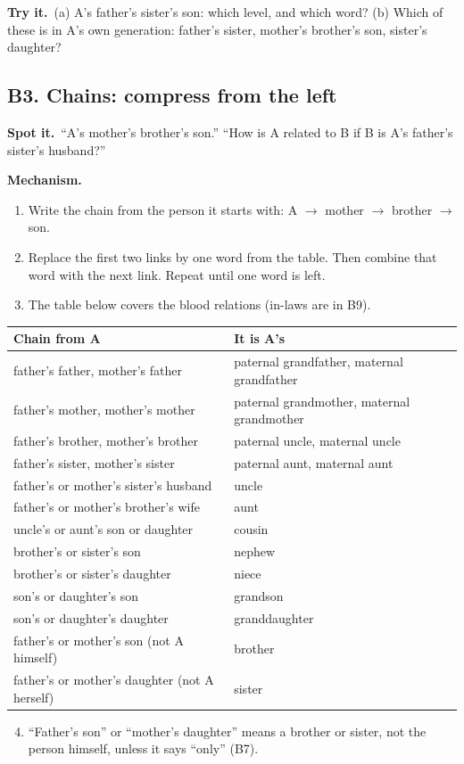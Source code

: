 \documentclass[11pt,a4paper]{article}
\let\oldsubsection\subsection
\renewcommand{\subsection}{\needspace{9\baselineskip}\oldsubsection}
\newcommand{\spot}{\textbf{\color{ember}Spot it.}\ }
\newcommand{\mech}{\textbf{\color{ember}Mechanism.}\ }
\newcommand{\tryit}[1]{\textbf{\color{ember}Try it.}\ #1}
\begin{document}
\tryit (a) A's father's sister's son: which level, and which word? (b) Which of these is in A's own generation: father's sister, mother's brother's son, sister's daughter?

\subsection{B3. Chains: compress from the left}
\spot ``A's mother's brother's son.'' ``How is A related to B if B is A's father's sister's husband?''

\mech
\begin{enumerate}
\item Write the chain from the person it starts with: A $\to$ mother $\to$ brother $\to$ son.
\item Replace the first two links by one word from the table. Then combine that word with the next link. Repeat until one word is left.
\item The table below covers the blood relations (in-laws are in B9).
\end{enumerate}
\begin{center}\small\renewcommand{\arraystretch}{1.18}\setlength{\tabcolsep}{8pt}
\begin{tabularx}{\linewidth}{@{}>{\raggedright\arraybackslash}X >{\raggedright\arraybackslash}X@{}}
\toprule
\textbf{\color{slate}Chain from A} & \textbf{\color{slate}It is A's} \\ \midrule
father's father, mother's father & paternal grandfather, maternal grandfather \\
father's mother, mother's mother & paternal grandmother, maternal grandmother \\
father's brother, mother's brother & paternal uncle, maternal uncle \\
father's sister, mother's sister & paternal aunt, maternal aunt \\
father's or mother's sister's husband & uncle \\
father's or mother's brother's wife & aunt \\
uncle's or aunt's son or daughter & cousin \\
brother's or sister's son & nephew \\
brother's or sister's daughter & niece \\
son's or daughter's son & grandson \\
son's or daughter's daughter & granddaughter \\
father's or mother's son (not A himself) & brother \\
father's or mother's daughter (not A herself) & sister \\
\bottomrule
\end{tabularx}\end{center}
\begin{enumerate}
\setcounter{enumi}{3}
\item ``Father's son'' or ``mother's daughter'' means a brother or sister, not the person himself, unless it says ``only'' (B7).
\end{enumerate}
\end{document}
